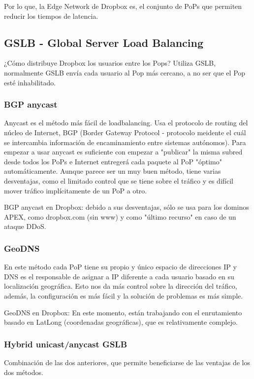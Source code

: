Por lo que, la Edge Network de Dropbox es, el conjunto de PoPs que permiten reducir los tiempos de latencia.

\subsection{GSLB - Global Server Load Balancing}

¿Cómo distribuye Dropbox los usuarios entre los Pops? Utiliza GSLB, normalmente GSLB envía cada usuario al Pop más cercano, a no ser que el Pop esté inhabilitado.

\subsubsection{BGP anycast}
Anycast es el método más fácil de loadbalancing. Usa el protocolo de routing del núcleo de Internet, BGP (Border Gateway Protocol - protocolo meidente el cuál se intercambia información de encaminamiento entre sistemas autónomos). Para empezar a usar anycast es suficiente con empezar a "publicar" la misma subred desde todos los PoPs e Internet entregerá cada paquete al PoP "óptimo" automáticamente. Aunque parece ser un muy buen método, tiene varias desventajas, como el limitado control que se tiene sobre el tráfico y es difícil mover tráfico implícitamente de un PoP a otro.

BGP anycast en Dropbox: debido a sus desventajas, sólo se usa para los dominos APEX, como dropbox.com (sin www) y como "último recurso" en caso de un ataque DDoS.

\subsubsection{GeoDNS}
En este método cada PoP tiene su propio y único espacio de direcciones IP y DNS es el responsable de asignar a IP diferente a cada usuario basado en su localización geográfica. Esto nos da más control sobre la dirección del tráfico, además, la configuración es más fácil y la solución de problemas es más simple.

GeoDNS en Dropbox: En este momento, están trabajando con el enrutamiento basado en LatLong (coordenadas geográficas), que es relativamente complejo.

\subsubsection{Hybrid unicast/anycast GSLB}

Combinación de las dos anteriores, que permite beneficiarse de las ventajas de los dos métodos.

